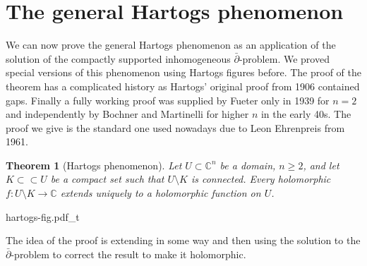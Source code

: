 \documentclass[12pt,openany]{book}
\newcommand{\C}{{\mathbb{C}}}
\theoremstyle{plain}
\newtheorem{thm}{Theorem}[section]
\theoremstyle{remark}
\theoremstyle{definition}
\theoremstyle{exercise}
\theoremstyle{example}
\begin{document}
\section{The general Hartogs phenomenon}

We can now prove the general Hartogs phenomenon as an application of the
solution of the compactly supported
inhomogeneous $\bar{\partial}$-problem.  We proved special
versions of this phenomenon using Hartogs figures before.
The proof of the theorem has a complicated history as
Hartogs' original proof from 1906 contained gaps.
Finally a fully working proof was supplied by Fueter only in 1939 for $n=2$
and independently by Bochner and Martinelli for higher $n$
in the early 40s. 
The proof we give is the
standard one used nowadays due to Leon Ehrenpreis from 1961.

\begin{thm}[Hartogs phenomenon]
Let $U \subset \C^n$ be a domain, $n \geq 2$, and let
$K \subset \subset U$ be a compact set such that
$U \setminus K$ is connected.  Every holomorphic $f \colon U \setminus K \to \C$
extends uniquely to a holomorphic function on $U$.
\end{thm}

\begin{center}
{hartogs-fig.pdf_t}
\end{center}

The idea of the proof is extending in some way and then using the solution
to the $\bar{\partial}$-problem to correct the result to make it
holomorphic.
\end{document}
